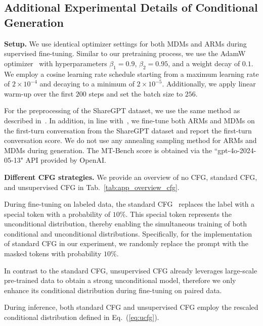 \documentclass{article} %
\begin{document}
\subsection{Additional Experimental Details of Conditional Generation}
\label{app:sec_details_sft}
\textbf{Setup.} We use identical optimizer settings for both MDMs and ARMs during supervised fine-tuning. Similar to our pretraining process, we use the AdamW optimizer~\citep{loshchilov2017decoupled} with hyperparameters $\beta_1 = 0.9$, $\beta_2 = 0.95$, and a weight decay of $0.1$. We employ a cosine learning rate schedule starting from a maximum learning rate of $2 \times 10^{-4}$ and decaying to a minimum of $2 \times 10^{-5}$. Additionally, we apply linear warm-up over the first $200$ steps and set the batch size to $256$. 

For the preprocessing of the ShareGPT dataset, we use the same method as described in~\cite{kou2024cllms}. In addition, in line with~\cite{kou2024cllms}, we fine-tune both ARMs and MDMs on the first-turn conversation from the ShareGPT dataset and report the first-turn conversation score. We do not use any annealing sampling method for ARMs and MDMs during generation. The MT-Bench score is obtained via the ``gpt-4o-2024-05-13" API provided by OpenAI.

\textbf{Different CFG strategies.} We provide an overview of no CFG, standard CFG, and unsupervised CFG in Tab.~\ref{tab:app_overview_cfg}.

During fine-tuning on labeled data, the standard CFG~\citep{ho2022classifier} replaces the label with a special token with a probability of $10\%$. This special token represents the unconditional distribution, thereby enabling the simultaneous training of both conditional and unconditional distributions. Specifically, for the implementation of standard CFG in our experiment, we randomly replace the prompt with the masked tokens with probability $10\%$.

In contrast to the standard CFG, unsupervised CFG already leverages large-scale pre-trained data to obtain a strong unconditional model, therefore we only enhance its conditional distribution during fine-tuning on paired data.

During inference, both standard CFG and unsupervised CFG employ the rescaled conditional distribution defined in Eq.~(\ref{eq:ucfg}).
\end{document}
